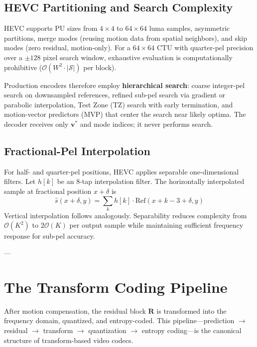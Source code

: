 \documentclass[11pt,journal,onecolumn]{IEEEtran}
\begin{document}
\subsection{HEVC Partitioning and Search Complexity}
HEVC supports PU sizes from $4 \times 4$ to $64 \times 64$ luma samples, asymmetric partitions, merge modes (reusing motion data from spatial neighbors), and skip modes (zero residual, motion-only). For a $64 \times 64$ CTU with quarter-pel precision over a $\pm 128$ pixel search window, exhaustive evaluation is computationally prohibitive ($\mathcal{O}(W^2 \cdot |\mathcal{S}|)$ per block).

Production encoders therefore employ \textbf{hierarchical search}: coarse integer-pel search on downsampled references, refined sub-pel search via gradient or parabolic interpolation, Test Zone (TZ) search with early termination, and motion-vector predictors (MVP) that center the search near likely optima. The decoder receives only $\mathbf{v}^*$ and mode indices; it never performs search.

\subsection{Fractional-Pel Interpolation}
For half- and quarter-pel positions, HEVC applies separable one-dimensional filters. Let $h[k]$ be an 8-tap interpolation filter. The horizontally interpolated sample at fractional position $x + \delta$ is
\begin{equation}
\hat{s}(x + \delta, y) = \sum_{k} h[k] \cdot \mathrm{Ref}(x + k - 3 + \delta, y)
\end{equation}
Vertical interpolation follows analogously. Separability reduces complexity from $\mathcal{O}(K^2)$ to $2\mathcal{O}(K)$ per output sample while maintaining sufficient frequency response for sub-pel accuracy.

---

\section{The Transform Coding Pipeline}

After motion compensation, the residual block $\mathbf{R}$ is transformed into the frequency domain, quantized, and entropy-coded. This pipeline---prediction $\rightarrow$ residual $\rightarrow$ transform $\rightarrow$ quantization $\rightarrow$ entropy coding---is the canonical structure of transform-based video codecs.
\end{document}
